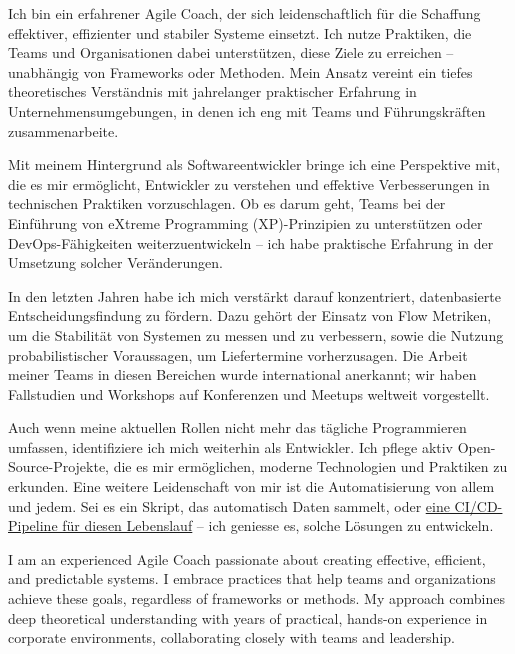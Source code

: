 {
}


\begin{cvparagraph}

{
	Ich bin ein erfahrener Agile Coach, der sich leidenschaftlich für die Schaffung effektiver, effizienter und stabiler Systeme einsetzt. Ich nutze Praktiken, die Teams und Organisationen dabei unterstützen, diese Ziele zu erreichen – unabhängig von Frameworks oder Methoden. Mein Ansatz vereint ein tiefes theoretisches Verständnis mit jahrelanger praktischer Erfahrung in Unternehmensumgebungen, in denen ich eng mit Teams und Führungskräften zusammenarbeite.
	
	Mit meinem Hintergrund als Softwareentwickler bringe ich eine Perspektive mit, die es mir ermöglicht, Entwickler zu verstehen und effektive Verbesserungen in technischen Praktiken vorzuschlagen. Ob es darum geht, Teams bei der Einführung von eXtreme Programming (XP)-Prinzipien zu unterstützen oder DevOps-Fähigkeiten weiterzuentwickeln – ich habe praktische Erfahrung in der Umsetzung solcher Veränderungen.  
	
	In den letzten Jahren habe ich mich verstärkt darauf konzentriert, datenbasierte Entscheidungsfindung zu fördern. Dazu gehört der Einsatz von Flow Metriken, um die Stabilität von Systemen zu messen und zu verbessern, sowie die Nutzung probabilistischer Voraussagen, um Liefertermine vorherzusagen. Die Arbeit meiner Teams in diesen Bereichen wurde international anerkannt; wir haben Fallstudien und Workshops auf Konferenzen und Meetups weltweit vorgestellt.  
	
	Auch wenn meine aktuellen Rollen nicht mehr das tägliche Programmieren umfassen, identifiziere ich mich weiterhin als Entwickler. Ich pflege aktiv Open-Source-Projekte, die es mir ermöglichen, moderne Technologien und Praktiken zu erkunden. Eine weitere Leidenschaft von mir ist die Automatisierung von allem und jedem. Sei es ein Skript, das automatisch Daten sammelt, oder \underline{\href{https://github.com/huserben/cv/actions}{eine CI/CD-Pipeline für diesen Lebenslauf}} – ich geniesse es, solche Lösungen zu entwickeln.
}
{
	I am an experienced Agile Coach passionate about creating effective, efficient, and predictable systems. I embrace practices that help teams and organizations achieve these goals, regardless of frameworks or methods. My approach combines deep theoretical understanding with years of practical, hands-on experience in corporate environments, collaborating closely with teams and leadership.

}
\end{cvparagraph}
